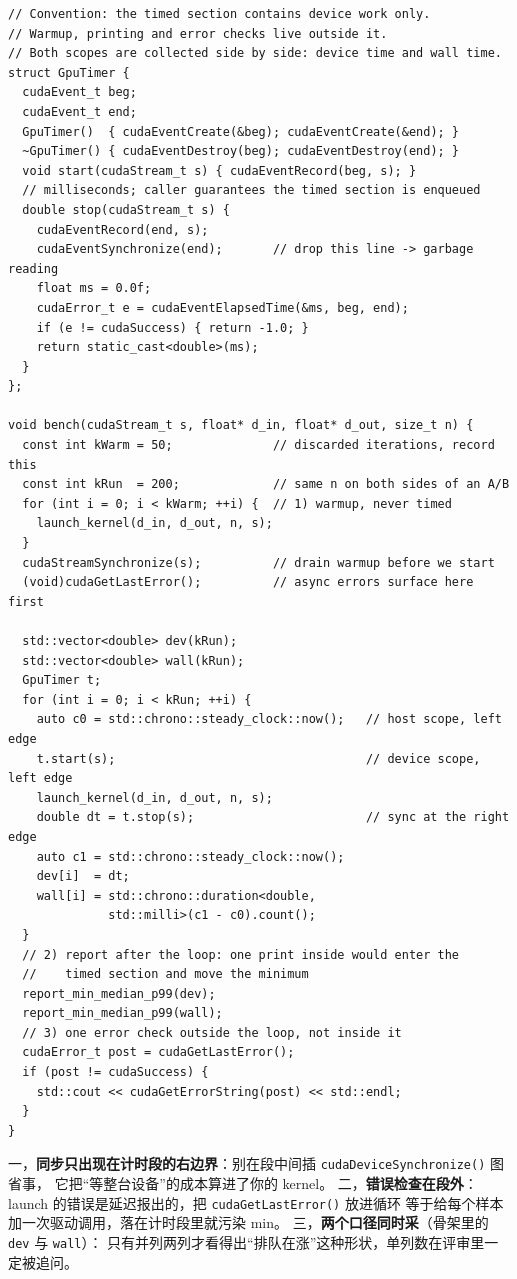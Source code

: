 \documentclass[12pt,a4paper,fontset=fandol]{ctexbook}
\newcommand{\Fn}[1]{\texttt{#1()}}
\newcommand{\Tp}[1]{\texttt{#1}}
\newcommand{\Bk}{\discretionary{}{}{}}
\begin{document}
\begin{lstlisting}[style=cppstyle, caption={GPU event 计时骨架：口径边界、warmup 与错误检查的位置都写在段外（可编译形态，数值由读者产生）}, label={lst:pm11-harness}]
// Convention: the timed section contains device work only.
// Warmup, printing and error checks live outside it.
// Both scopes are collected side by side: device time and wall time.
struct GpuTimer {
  cudaEvent_t beg;
  cudaEvent_t end;
  GpuTimer()  { cudaEventCreate(&beg); cudaEventCreate(&end); }
  ~GpuTimer() { cudaEventDestroy(beg); cudaEventDestroy(end); }
  void start(cudaStream_t s) { cudaEventRecord(beg, s); }
  // milliseconds; caller guarantees the timed section is enqueued
  double stop(cudaStream_t s) {
    cudaEventRecord(end, s);
    cudaEventSynchronize(end);       // drop this line -> garbage reading
    float ms = 0.0f;
    cudaError_t e = cudaEventElapsedTime(&ms, beg, end);
    if (e != cudaSuccess) { return -1.0; }
    return static_cast<double>(ms);
  }
};

void bench(cudaStream_t s, float* d_in, float* d_out, size_t n) {
  const int kWarm = 50;              // discarded iterations, record this
  const int kRun  = 200;             // same n on both sides of an A/B
  for (int i = 0; i < kWarm; ++i) {  // 1) warmup, never timed
    launch_kernel(d_in, d_out, n, s);
  }
  cudaStreamSynchronize(s);          // drain warmup before we start
  (void)cudaGetLastError();          // async errors surface here first

  std::vector<double> dev(kRun);
  std::vector<double> wall(kRun);
  GpuTimer t;
  for (int i = 0; i < kRun; ++i) {
    auto c0 = std::chrono::steady_clock::now();   // host scope, left edge
    t.start(s);                                   // device scope, left edge
    launch_kernel(d_in, d_out, n, s);
    double dt = t.stop(s);                        // sync at the right edge
    auto c1 = std::chrono::steady_clock::now();
    dev[i]  = dt;
    wall[i] = std::chrono::duration<double,
              std::milli>(c1 - c0).count();
  }
  // 2) report after the loop: one print inside would enter the
  //    timed section and move the minimum
  report_min_median_p99(dev);
  report_min_median_p99(wall);
  // 3) one error check outside the loop, not inside it
  cudaError_t post = cudaGetLastError();
  if (post != cudaSuccess) {
    std::cout << cudaGetErrorString(post) << std::endl;
  }
}
\end{lstlisting}

\begin{guideline}[title={要点：骨架里三条不动的规矩}]
\label{box:pm11-guideline-skeleton}
一，\textbf{同步只出现在计时段的右边界}：别在段中间插 \Fn{cudaDevice{\Bk}Synchronize} 图省事，
它把``等整台设备''的成本算进了你的 kernel。
二，\textbf{错误检查在段外}：launch 的错误是延迟报出的，把 \Fn{cudaGetLast{\Bk}Error} 放进循环
等于给每个样本加一次驱动调用，落在计时段里就污染 min。
三，\textbf{两个口径同时采}（骨架里的 \Tp{dev} 与 \Tp{wall}）：
只有并列两列才看得出``排队在涨''这种形状，单列数在评审里一定被追问。
\end{guideline}
\end{document}
